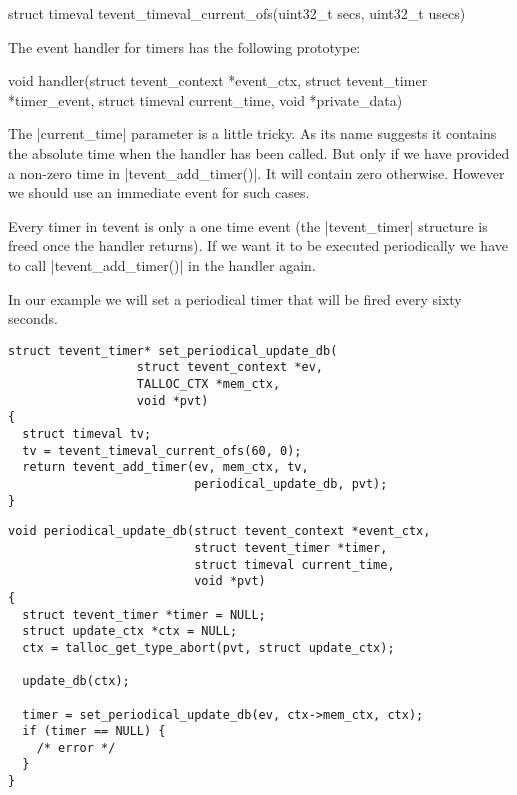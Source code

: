 \begin{funcproto}
struct timeval tevent_timeval_current_ofs(uint32_t secs,
                                          uint32_t usecs)
\end{funcproto}
\funclistend
The event handler for timers has the following prototype:

\begin{funcproto}
void handler(struct tevent_context *event_ctx,
             struct tevent_timer *timer_event,
             struct timeval current_time,
             void *private_data)
\end{funcproto}
\funclistend
The |current_time| parameter is a little tricky. As its name suggests it
contains the absolute time when the handler has been called. But only if we have
provided a non-zero time in |tevent_add_timer()|. It will contain zero
otherwise. However we should use an immediate event for such cases.

Every timer in tevent is only a one time event (the |tevent_timer| structure is
freed once the handler returns). If we want it to be executed periodically we
have to call |tevent_add_timer()| in the handler again.

In our example we will set a periodical timer that will be fired every sixty
seconds.

\begin{lstlisting}[morekeywords={tevent_add_timer},name=PeriodicalUpdateDB]
struct tevent_timer* set_periodical_update_db(
                  struct tevent_context *ev,
                  TALLOC_CTX *mem_ctx,
                  void *pvt)
{
  struct timeval tv;
  tv = tevent_timeval_current_ofs(60, 0);
  return tevent_add_timer(ev, mem_ctx, tv,
                          periodical_update_db, pvt);
}
\end{lstlisting}
\begin{lstlisting}[caption={Periodical update of a database},firstnumber=auto,
morekeywords={set_periodical_update_db},name=PeriodicalUpdateDB]
void periodical_update_db(struct tevent_context *event_ctx,
                          struct tevent_timer *timer,
                          struct timeval current_time,
                          void *pvt)
{
  struct tevent_timer *timer = NULL;
  struct update_ctx *ctx = NULL;
  ctx = talloc_get_type_abort(pvt, struct update_ctx);

  update_db(ctx);
  
  timer = set_periodical_update_db(ev, ctx->mem_ctx, ctx);
  if (timer == NULL) {
    /* error */
  }
}
\end{lstlisting}

